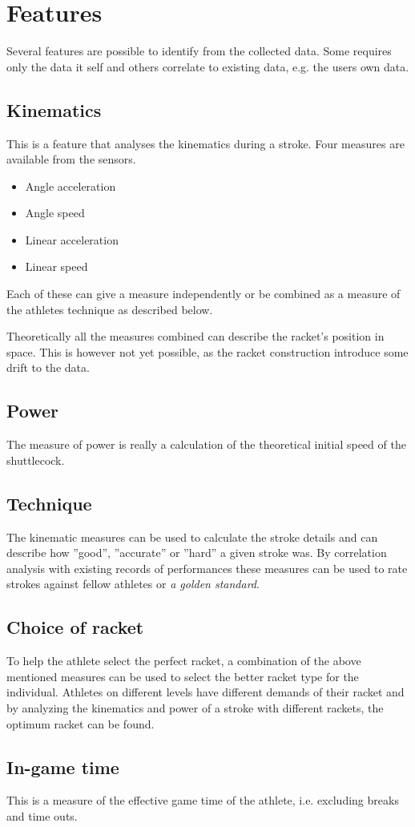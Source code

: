 
\section{Features}
Several features are possible to identify from the collected data.
Some requires only the data it self and others correlate to existing data, e.g. the users own data.

\subsection*{Kinematics}
This is a feature that analyses the kinematics during a stroke.
Four measures are available from the sensors.

\begin{itemize}
    \item Angle acceleration
    \item Angle speed
    \item Linear acceleration
    \item Linear speed
\end{itemize}

Each of these can give a measure independently or be combined as a measure of the athletes technique as described below.

Theoretically all the measures combined can describe the racket's position in space. 
This is however not yet possible, as the racket construction introduce some drift to the data.

\subsection*{Power}
The measure of power is really a calculation of the theoretical initial speed of the shuttlecock.

\subsection*{Technique}
The kinematic measures can be used to calculate the stroke details and can describe how ''good'', ''accurate'' or ''hard'' a given stroke was.
By correlation analysis with existing records of performances these measures can be used to rate strokes against fellow athletes or \textit{a golden standard}.

\subsection*{Choice of racket}
To help the athlete select the perfect racket, a combination of the above mentioned measures can be used to select the better racket type for the individual.
Athletes on different levels have different demands of their racket and by analyzing the kinematics and power of a stroke with different rackets, the optimum racket can be found.

\subsection*{In-game time}
This is a measure of the effective game time of the athlete, i.e. excluding breaks and time outs.
